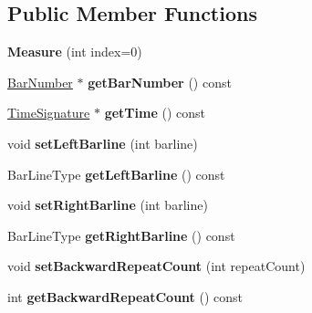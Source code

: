 \subsection*{Public Member Functions}
\begin{DoxyCompactItemize}
\item 
\mbox{\label{class_o_v_e_1_1_measure_a9a390c390a79cae01b20d9b921232237}} 
{\bfseries Measure} (int index=0)
\item 
\mbox{\label{class_o_v_e_1_1_measure_a879861d20d5112307f2fc5c92c517c68}} 
\hyperlink{class_o_v_e_1_1_bar_number}{Bar\+Number} $\ast$ {\bfseries get\+Bar\+Number} () const
\item 
\mbox{\label{class_o_v_e_1_1_measure_a3e145f01a2b88cf2768f415e656db6ba}} 
\hyperlink{class_o_v_e_1_1_time_signature}{Time\+Signature} $\ast$ {\bfseries get\+Time} () const
\item 
\mbox{\label{class_o_v_e_1_1_measure_a5fab24dd5f0c8840a506ddedeb94ab36}} 
void {\bfseries set\+Left\+Barline} (int barline)
\item 
\mbox{\label{class_o_v_e_1_1_measure_ab1b29c6e452725c2dd29d9d51c9d6147}} 
Bar\+Line\+Type {\bfseries get\+Left\+Barline} () const
\item 
\mbox{\label{class_o_v_e_1_1_measure_a1b27a2ab831fd5f44a6512342dd1c35d}} 
void {\bfseries set\+Right\+Barline} (int barline)
\item 
\mbox{\label{class_o_v_e_1_1_measure_a96e636c561dc649526055f3e73e9a53d}} 
Bar\+Line\+Type {\bfseries get\+Right\+Barline} () const
\item 
\mbox{\label{class_o_v_e_1_1_measure_aab115a7019cae1dbb4c4c03addc80a8e}} 
void {\bfseries set\+Backward\+Repeat\+Count} (int repeat\+Count)
\item 
\mbox{\label{class_o_v_e_1_1_measure_aceba347873b260f81c0fc8426fb81822}} 
int {\bfseries get\+Backward\+Repeat\+Count} () const
\item 

\end{DoxyCompactItemize}
